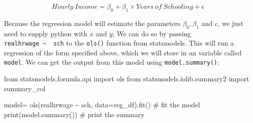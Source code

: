 \documentclass[
  letterpaper,
  DIV=11,
  numbers=noendperiod]{scrreprt}
\newenvironment{Shaded}{\begin{snugshade}}{\end{snugshade}}
\newcommand{\BuiltInTok}[1]{\textcolor[rgb]{0.00,0.23,0.31}{#1}}
\newcommand{\CommentTok}[1]{\textcolor[rgb]{0.37,0.37,0.37}{#1}}
\newcommand{\ImportTok}[1]{\textcolor[rgb]{0.00,0.46,0.62}{#1}}
\newcommand{\NormalTok}[1]{\textcolor[rgb]{0.00,0.23,0.31}{#1}}
\newcommand{\OperatorTok}[1]{\textcolor[rgb]{0.37,0.37,0.37}{#1}}
\newcommand{\StringTok}[1]{\textcolor[rgb]{0.13,0.47,0.30}{#1}}
\begin{document}
\[Hourly\ Income= \beta_0 + \beta_1 \times Years\ of\ Schooling +\epsilon \]

Because the regression model will estimate the parameters
\(\beta_0, \beta_1\) and \(\epsilon\), we just need to supply python
with \(x\) and \(y\); We can do so by passing
\texttt{realhrwage\ \textasciitilde{}\ \ sch} to the \texttt{ols()}
function from statsmodels. This will run a regression of the form
specified above, which we will store in an variable called
\texttt{model}. We can get the output from this model using
\texttt{model.summary()}:

\begin{Shaded}
\begin{Highlighting}[]
\ImportTok{from}\NormalTok{ statsmodels.formula.api }\ImportTok{import}\NormalTok{ ols}
\ImportTok{from}\NormalTok{ statsmodels.iolib.summary2 }\ImportTok{import}\NormalTok{ summary\_col}

\NormalTok{model}\OperatorTok{=}\NormalTok{ ols(}\StringTok{\textquotesingle{}realhrwage \textasciitilde{}  sch\textquotesingle{}}\NormalTok{, data}\OperatorTok{=}\NormalTok{reg\_df).fit() }\CommentTok{\# fit the model}
\BuiltInTok{print}\NormalTok{(model.summary()) }\CommentTok{\# print the summary}
\end{Highlighting}
\end{Shaded}
\end{document}
